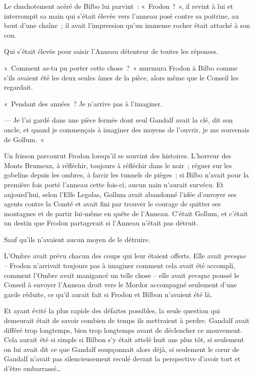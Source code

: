 Le chuchotement acéré de Bilbo lui parvint~: «~Frodon~!~», il revint à lui et interrompit sa main qui s'était élevée vers l'anneau posé contre sa poitrine, au bout d'une chaîne~; il avait l'impression qu'un immense rocher était attaché à son cou.

Qui s'était élevée pour saisir l'Anneau détenteur de toutes les réponses.

«~Comment as-tu pu porter cette chose~?~» murmura Frodon à Bilbo comme s'ils avaient été les deux seules âmes de la pièce, alors même que le Conseil les regardait.

«~Pendant des années~? Je n'arrive pas à l'imaginer.

--- Je l'ai gardé dans une pièce fermée dont seul Gandalf avait la clé, dit son oncle, et quand je commençais à imaginer des moyens de l'ouvrir, je me souvenais de Gollum.~»

Un frisson parcourut Frodon lorsqu'il se souvint des histoires. L'horreur des Monts Brumeux, à réfléchir, toujours à réfléchir dans le noir~; régner sur les gobelins depuis les ombres, à farcir les tunnels de pièges~; si Bilbo n'avait pour la première fois porté l'anneau cette fois-ci, aucun nain n'aurait survécu. Et aujourd'hui, selon l'Elfe Legolas, Gollum avait abandonné l'idée d'envoyer ses agents contre la Comté et avait fini par trouver le courage de quitter ses montagnes et de partir lui-même en quête de l'Anneau. C'était Gollum, et c'était un destin que Frodon partagerait si l'Anneau n'était pas détruit.

Sauf qu'ils n'avaient aucun moyen de le détruire.

L'Ombre avait prévu chacun des coups qui leur étaient offerts. Elle avait \emph{presque} -- Frodon n'arrivait toujours pas à imaginer comment cela avait été accompli, comment l'Ombre avait manigancé un telle chose -- elle avait \emph{presque} poussé le Conseil à envoyer l'Anneau droit vers le Mordor accompagné seulement d'une garde réduite, ce qu'il aurait fait si Frodon et Bilbon n'avaient été là.

Et ayant évité la plus rapide des défaites possibles, la seule question qui demeurait était de savoir combien de temps ils mettraient à perdre. Gandalf avait différé trop longtemps, bien trop longtemps avant de déclencher ce mouvement. Cela aurait été si simple si Bilbon s'y était attelé huit ans plus tôt, si seulement on lui avait dit ce que Gandalf soupçonnait alors déjà, si seulement le cœur de Gandalf n'avait pas silencieusement reculé devant la perspective d'avoir tort et d'être embarrassé…

